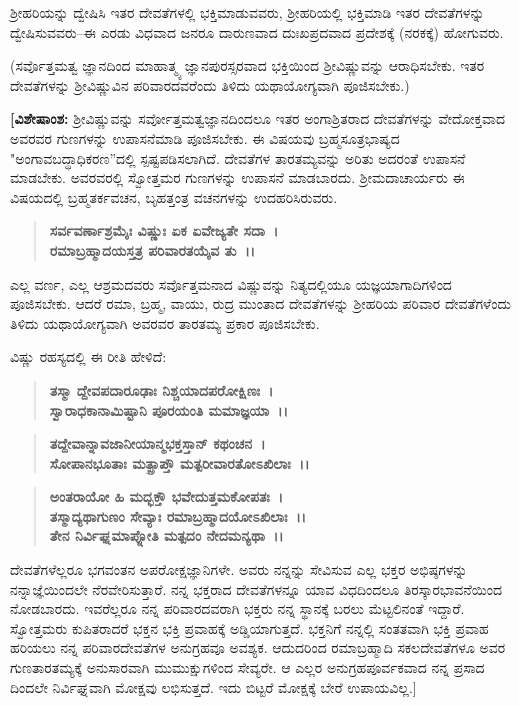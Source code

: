 ಶ‍್ರೀಹರಿಯನ್ನು ದ್ವೇಷಿಸಿ ಇತರ ದೇವತೆಗಳಲ್ಲಿ ಭಕ್ತಿಮಾಡುವವರು, ಶ‍್ರೀಹರಿಯಲ್ಲಿ ಭಕ್ತಿಮಾಡಿ ಇತರ ದೇವತೆಗಳನ್ನು ದ್ವೇಷಿಸುವವರು–ಈ ಎರಡು ವಿಧವಾದ ಜನರೂ ದಾರುಣವಾದ ದುಃಖಪ್ರದವಾದ ಪ್ರದೇಶಕ್ಕೆ (ನರಕಕ್ಕೆ) ಹೋಗುವರು.

(ಸರ್ವೊತ್ತಮತ್ವ ಜ್ಞಾನದಿಂದ ಮಾಹಾತ್ಮ್ಯ ಜ್ಞಾನಪುರಸ್ಸರವಾದ ಭಕ್ತಿಯಿಂದ ಶ‍್ರೀವಿಷ್ಣುವನ್ನು ಆರಾಧಿಸಬೇಕು. ಇತರ ದೇವತೆಗಳನ್ನು ಶ‍್ರೀವಿಷ್ಣುವಿನ ಪರಿವಾರದವರೆಂದು ತಿಳಿದು ಯಥಾಯೋಗ್ಯವಾಗಿ ಪೂಜಿಸಬೇಕು.)

\textbf{[ವಿಶೇಷಾಂಶ:} ಶ‍್ರೀವಿಷ್ಣುವನ್ನು ಸರ್ವೋತ್ತಮತ್ವಜ್ಞಾನದಿಂದಲೂ ಇತರ ಅಂಗಾಶ್ರಿತರಾದ ದೇವತೆಗಳನ್ನು ವೇದೋಕ್ತವಾದ ಅವರವರ ಗುಣಗಳನ್ನು ಉಪಾಸನೆಮಾಡಿ ಪೂಜಿಸಬೇಕು. ಈ ವಿಷಯವು ಬ್ರಹ್ಮಸೂತ್ರಭಾಷ್ಯದ "ಅಂಗಾವಬದ್ಧಾಧಿಕರಣ”ದಲ್ಲಿ ಸ್ಪಷ್ಟಪಡಿಸಲಾಗಿದೆ. ದೇವತೆ\-ಗಳ ತಾರತಮ್ಯವನ್ನು ಅರಿತು ಅದರಂತೆ ಉಪಾಸನೆ ಮಾಡಬೇಕು. ಅವರವರಲ್ಲಿ ಸ್ವೋತ್ತಮರ ಗುಣಗಳನ್ನು ಉಪಾಸನೆ ಮಾಡಬಾರದು. ಶ‍್ರೀಮದಾಚಾರ್ಯರು ಈ ವಿಷಯ\-ದಲ್ಲಿ ಬ್ರಹ್ಮತರ್ಕವಚನ, ಬೃಹತ್ತಂತ್ರ ವಚನಗಳನ್ನು ಉದಹರಿಸಿರುವರು.

\begin{verse}
\textbf{ಸರ್ವವರ್ಣಾಶ್ರಮೈಃ ವಿಷ್ಣುಃ ಏಕ ಏವೇಜ್ಯತೇ ಸದಾ~।}\\\textbf{ರಮಾಬ್ರಹ್ಮಾದಯಸ್ತತ್ರ ಪರಿವಾರತಯೈವ ತು~।।} 
\end{verse}

ಎಲ್ಲ ವರ್ಣ, ಎಲ್ಲ ಆಶ್ರಮದವರು ಸರ್ವೊತ್ತಮನಾದ ವಿಷ್ಣುವನ್ನು ನಿತ್ಯದಲ್ಲಿಯೂ ಯಜ್ಞಯಾಗಾದಿಗಳಿಂದ ಪೂಜಿಸಬೇಕು. ಆದರೆ ರಮಾ, ಬ್ರಹ್ಮ, ವಾಯು, ರುದ್ರ ಮುಂತಾದ ದೇವತೆ\-ಗಳನ್ನು ಶ‍್ರೀಹರಿಯ ಪರಿವಾರ ದೇವತೆಗಳೆಂದು ತಿಳಿದು ಯಥಾಯೋಗ್ಯವಾಗಿ ಅವರವರ ತಾರತಮ್ಯ ಪ್ರಕಾರ ಪೂಜಿಸಬೇಕು.

\begin{flushleft}
ವಿಷ್ಣು ರಹಸ್ಯದಲ್ಲಿ ಈ ರೀತಿ ಹೇಳಿದೆ: 
\end{flushleft}

\begin{verse}
\textbf{ತಸ್ಮಾ ದ್ದೇವಪದಾರೂಢಾಃ ನಿಶ್ಚಯಾದಪರೋಕ್ಷಿಣಃ~।}\\\textbf{ಸ್ವಾರಾಧಕಾನಾಮಿಷ್ಟಾನಿ ಪೂರಯಂತಿ ಮಮಾಜ್ಞಯಾ~।। }
\end{verse}

\begin{verse}
\textbf{ತದ್ದೇವಾನ್ನಾವಜಾನೀಯಾನ್ಮಭಕ್ತಸ್ತಾನ್ ಕಥಂಚನ~।}\\\textbf{ಸೋಪಾನಭೂತಾಃ ಮತ್ಪ್ರಾಪ್ತೌ ಮತ್ಪರೀವಾರತೋಽಖಿಲಾಃ~।।} 
\end{verse}

\begin{verse}
\textbf{ಅಂತರಾಯೋ ಹಿ ಮದ್ಭಕ್ತೌ ಭವೇದುತ್ತಮಕೋಪತಃ~।}\\\textbf{ತಸ್ಮಾದ್ಯಥಾಗುಣಂ ಸೇವ್ಯಾಃ ರಮಾಬ್ರಹ್ಮಾದಯೋಽಖಿಲಾಃ~।। }\\\textbf{ತೇನ ನಿರ್ವಿಘ್ನಮಾಪ್ನೋತಿ ಮತ್ಪದಂ ನೇದಮನ್ಯಥಾ~।।}
\end{verse}

ದೇವತೆಗಳೆಲ್ಲರೂ ಭಗವಂತನ ಅಪರೋಕ್ಷಜ್ಞಾನಿಗಳೇ. ಅವರು ನನ್ನನ್ನು ಸೇವಿಸುವ ಎಲ್ಲ ಭಕ್ತರ ಅಭಿಷ್ಠಗಳನ್ನು ನನ್ನಾಜ್ಞೆಯಿಂದಲೇ ನೆರವೇರಿಸುತ್ತಾರೆ. ನನ್ನ ಭಕ್ತರಾದ ದೇವತೆ\-ಗಳನ್ನೂ ಯಾವ ವಿಧದಿಂದಲೂ ತಿರಸ್ಕಾರಭಾವನೆಯಿಂದ ನೋಡಬಾರದು. ಇವರೆಲ್ಲರೂ ನನ್ನ ಪರಿವಾರದವರಾಗಿ ಭಕ್ತರು ನನ್ನ ಸ್ಥಾನಕ್ಕೆ ಬರಲು ಮೆಟ್ಟಲಿನಂತೆ ಇದ್ದಾರೆ. ಸ್ವೋತ್ತಮರು ಕುಪಿತರಾದರೆ ಭಕ್ತನ ಭಕ್ತಿ ಪ್ರವಾಹಕ್ಕೆ ಅಡ್ಡಿಯಾಗುತ್ತದೆ. ಭಕ್ತನಿಗೆ ನನ್ನಲ್ಲಿ ಸಂತತವಾಗಿ ಭಕ್ತಿ ಪ್ರವಾಹ ಹರಿಯಲು ನನ್ನ ಪರಿವಾರದೇವತೆಗಳ ಅನುಗ್ರಹವೂ ಅವಶ್ಯಕ. ಆದುದರಿಂದ ರಮಾಬ್ರಹ್ಮಾದಿ ಸಕಲದೇವತೆಗಳೂ ಅವರ ಗುಣತಾರತಮ್ಯಕ್ಕೆ ಅನುಸಾರವಾಗಿ ಮುಮುಕ್ಷುಗಳಿಂದ ಸೇವ್ಯರೇ. ಆ ಎಲ್ಲರ ಅನುಗ್ರಹಪೂರ್ವಕವಾದ ನನ್ನ ಪ್ರಸಾದ ದಿಂದಲೇ ನಿರ್ವಿಘ್ನವಾಗಿ ಮೋಕ್ಷವು ಲಭಿಸುತ್ತದೆ. ಇದು ಬಿಟ್ಟರೆ ಮೋಕ್ಷಕ್ಕೆ ಬೇರೆ ಉಪಾಯವಿಲ್ಲ.]

